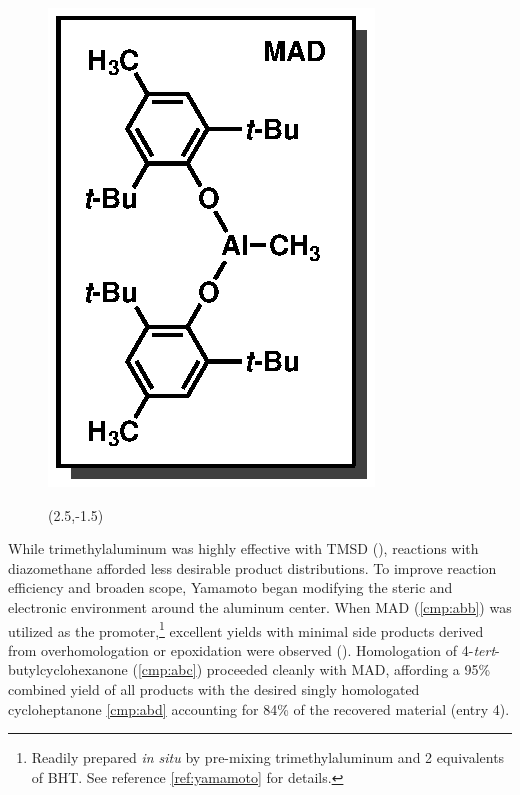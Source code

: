 \begin{figure}
  \vspace{-25pt}
  \begin{center}
    \includegraphics[scale=0.8]{chp_diazobkg/images/mad}
  \end{center}
  \begin{textblock}{1}(2.5,-1.5)  \end{textblock}
  \vspace{-30pt}
\end{figure}
While trimethylaluminum was highly effective with TMSD (), reactions with diazomethane afforded less desirable product distributions. To improve reaction efficiency and
broaden scope, Yamamoto began modifying the steric and electronic environment around the aluminum
center. When MAD (\ref{cmp:abb}) was utilized as the promoter,\footnote{Readily prepared \textit{in
situ} by pre-mixing trimethylaluminum and 2 equivalents of BHT. See reference \ref{ref:yamamoto}
for details.} excellent yields with minimal side products derived from overhomologation or
epoxidation were observed (). Homologation of 4-\textit{tert}-butylcyclohexanone
(\ref{cmp:abc}) proceeded cleanly with MAD, affording a 95\% combined yield of all products with the desired singly homologated cycloheptanone \ref{cmp:abd} accounting
for 84\% of the recovered material (entry 4).
